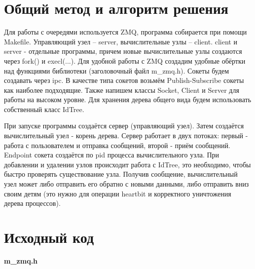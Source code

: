 \section{Общий метод и алгоритм решения}

Для работы с очередями используется ZMQ, программа собирается при помощи Makefile. Управляющий узел – server, вычислительные узлы – client. client и server - отдельные программы, причем новые вычислительные узлы создаются через fork() и execl(...). Для удобной работы с ZMQ создадим удобные обёртки над функциями библиотеки (заголовочный файл m\_zmq.h). Сокеты будем создавать через ipc. В качестве типа сокетов возьмём Publish-Subscribe сокеты как наиболее подходящие. Также напишем классы Socket, Client и Server для работы на высоком уровне. Для хранения дерева общего вида будем использовать собственный класс IdTree.


При запуске программы создаётся сервер (управляющий узел). Затем создаётся вычислительный узел - корень дерева. Сервер работает в двух потоках: первый - работа с пользователем и отправка сообщений, второй - приём сообщений. Endpoint сокета создаётся по pid процесса вычислительного узла. При добавлении и удалении узлов происходит работа с IdTree, это необходимо, чтобы быстро проверять существование узла. Получив сообщение, вычислительный узел может либо отправить его обратно с новыми данными, либо отправить вниз своим детям (это нужно для операции heartbit и корректного уничтожения дерева процессов).

\pagebreak

\section{Исходный код}

\textbf{m\_zmq.h}

